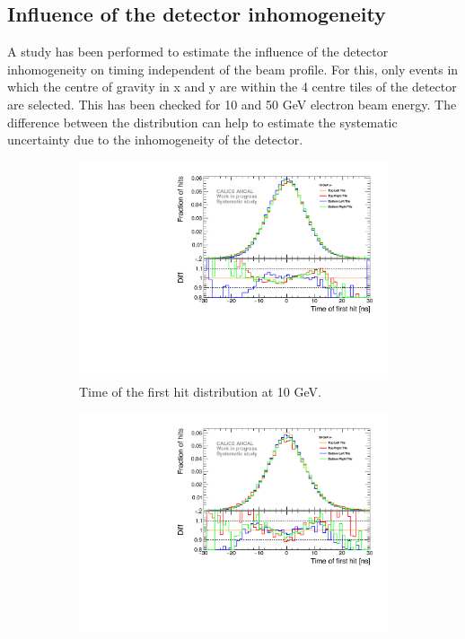 \subsection{Influence of the detector inhomogeneity}
\label{subsec:det_inhomo}

A study has been performed to estimate the influence of the detector inhomogeneity on timing independent of the beam profile. For this, only events in which the centre of gravity in x and y are within the 4 centre tiles of the detector are selected. This has been checked for 10 and 50 GeV electron beam energy. The difference between the distribution can help to estimate the systematic uncertainty due to the inhomogeneity of the detector.
\begin{figure}[t]
	\begin{subfigure}[t]{0.45\textwidth}
		\centering
		\includegraphics[width=1\textwidth]{chap5/fig_AHCAL_timing/Electrons/Systematic_Inhomogeneity_10GeV.pdf}
		\caption{Time of the first hit distribution at 10 GeV.}\label{fig:timing_inhomo_10GeV}
	\end{subfigure}
	\hfill
	\begin{subfigure}[t]{0.45\textwidth}
		\centering
		\includegraphics[width=1\textwidth]{chap5/fig_AHCAL_timing/Electrons/Systematic_Inhomogeneity_50GeV.pdf}

\end{subfigure}
\end{figure}

